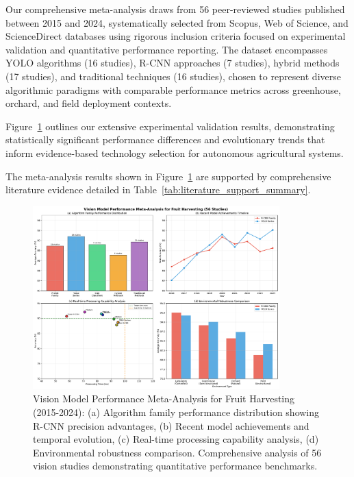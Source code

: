 \documentclass{ieeeaccess}
\begin{document}
Our comprehensive meta-analysis draws from 56 peer-reviewed studies published between 2015 and 2024, systematically selected from Scopus, Web of Science, and ScienceDirect databases using rigorous inclusion criteria focused on experimental validation and quantitative performance reporting. The dataset encompasses YOLO algorithms (16 studies), R-CNN approaches (7 studies), hybrid methods (17 studies), and traditional techniques (16 studies), chosen to represent diverse algorithmic paradigms with comparable performance metrics across greenhouse, orchard, and field deployment contexts.

Figure~\ref{fig:meta_analysis_ieee} outlines our extensive experimental validation results, demonstrating statistically significant performance differences and evolutionary trends that inform evidence-based technology selection for autonomous agricultural systems.

The meta-analysis results shown in Figure~\ref{fig:meta_analysis_ieee} are supported by comprehensive literature evidence detailed in Table~\ref{tab:literature_support_summary}.

\begin{figure}[htbp]
\centering
\includegraphics[width=0.85\textwidth]{v5_vision_meta_fig4.pdf}
\caption{Vision Model Performance Meta-Analysis for Fruit Harvesting (2015-2024): (a) Algorithm family performance distribution showing R-CNN precision advantages, (b) Recent model achievements and temporal evolution, (c) Real-time processing capability analysis, (d) Environmental robustness comparison. Comprehensive analysis of 56 vision studies demonstrating quantitative performance benchmarks.}
\label{fig:meta_analysis_ieee}
\end{figure}
\end{document}
